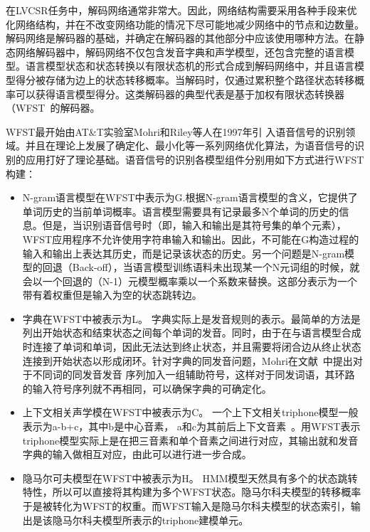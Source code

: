 在LVCSR任务中，解码网络通常非常大。因此，网络结构需要采用各种手段来优化网络结构，并在不改变网络功能的情况下尽可能地减少网络中的节点和边数量。解码网络是解码器的基础，并确定在解码器的其他部分中应该使用哪种方法。在静态网络解码器中，解码网络不仅包含发音字典和声学模型，还包含完整的语言模型。语言模型状态和状态转换以有限状态机的形式合成到解码网络中，并且语言模型得分被存储为边上的状态转移概率。当解码时，仅通过累积整个路径状态转移概率可以获得语言模型得分。这类解码器的典型代表是基于加权有限状态转换器（WFST~\cite{mohri2002weighted}的解码器。

WFST最开始由AT\&T实验室Mohri和Riley等人在1997年引
入语音信号的识别领域。并且在理论上发展了确定化、最小化等一系列网络优化算法，为语音信号的识别的应用打好了理论基础。语音信号的识别各模型组件分别用如下方式进行WFST构建：

\begin{itemize}
\item N-gram语言模型在WFST中表示为G.根据N-gram语言模型的含义，它提供了单词历史的当前单词概率。语言模型需要具有记录最多N个单词的历史的信息。但是，当识别语音信号时（即，输入和输出是其符号集的单个元素），WFST应用程序不允许使用字符串输入和输出。因此，不可能在G构造过程的输入和输出上表达其历史，而是记录该状态的历史。另一个问题是N-gram模型的回退（Back-off），当语言模型训练语料未出现某一个N元词组的时候，就会以一个回退的（N-1）元模型概率乘以一个系数来替换。这部分表示为一个带有着权重但是输入为空的状态跳转边。

\item 字典在WFST中被表示为L。
字典实际上是发音规则的表示。最简单的方法是列出开始状态和结束状态之间每个单词的发音。同时，由于在与语言模型合成时连接了单词和单词，因此无法达到终止状态，并且需要将闭合边从终止状态连接到开始状态以形成闭环。针对字典的同发音问题，Mohri在文献~\cite{mohri2002weighted}中提出对于不同词的同发音发音
序列加入一组辅助符号，这样对于同发词语，其环路的输入符号序列就不再相同，可以确保字典的可确定化。

\item 上下文相关声学模在WFST中被表示为C。
一个上下文相关triphone模型一般表示为a-b+c，其中b是中心音素，
a和c为其前后上下文音素~\cite{seide2011conversational}。用WFST表示triphone模型实际上是在把三音素和单个音素之间进行对应，其输出就和发音字典的输入做相互对应，由此可以进行进一步合成。

\item 隐马尔可夫模型在WFST中被表示为H。
HMM模型天然具有多个的状态跳转特性，所以可以直接将其构建为多个WFST状态。隐马尔科夫模型的转移概率于是被转化为WFST的权重。而WFST输入是隐马尔科夫模型的状态索引，输出是该隐马尔科夫模型所表示的triphone建模单元。
\end{itemize}

